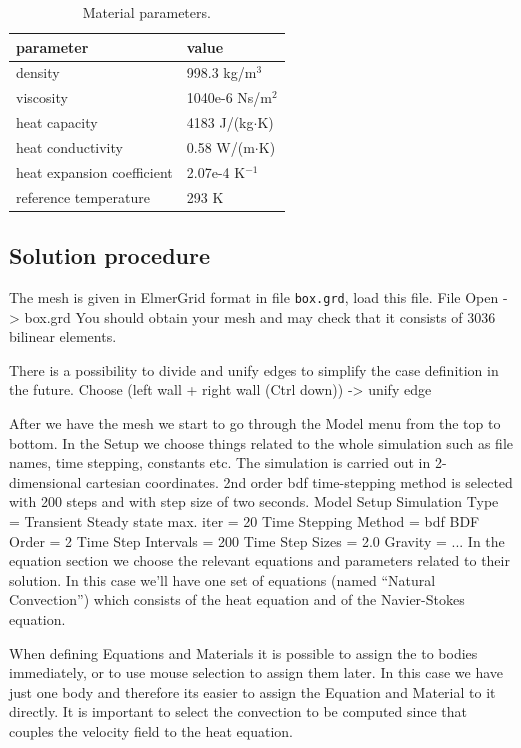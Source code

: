 \begin{table}[h]
\caption{Material parameters.}
\label{tb:matpar}
\begin{center}
\begin{tabular}{ll} \hline
parameter  & value \\ \hline
density & 998.3 kg/m$^{3}$ \\
viscosity & 1040e-6 Ns/m$^{2}$ \\
heat capacity & 4183 J/(kg$\cdot$K) \\
heat conductivity & 0.58 W/(m$\cdot$K)       \\
heat expansion coefficient & 2.07e-4 K$^{-1}$      \\ 
reference temperature & 293 K       \\ \hline
\end{tabular}
\end{center}
\end{table}


\subsection*{Solution procedure}

The mesh is given in ElmerGrid format in file \texttt{box.grd}, load this file.
\ttbegin
File 
  Open -> box.grd
\ttend
You should obtain your mesh and may check that it consists of 3036 bilinear elements.

There is a possibility to divide and unify edges to simplify the case definition in the future.
\ttbegin
Choose (left wall + right wall (Ctrl down)) -> unify edge
\ttend

After we have the mesh we start to go through the Model menu from the top to bottom. 
In the Setup we choose things related to the whole simulation such as file names, 
time stepping, constants etc.
The simulation is carried out in 2-dimensional cartesian
coordinates. 2nd order bdf time-stepping method is selected with 200 steps
and with step size of two seconds.
\ttbegin
Model
  Setup 
    Simulation Type = Transient
    Steady state max. iter = 20
    Time Stepping Method = bdf
    BDF Order = 2
    Time Step Intervals = 200
    Time Step Sizes = 2.0
    Gravity = ...
\ttend
In the equation section we choose the relevant equations and parameters related to their solution. 
In this case we'll have one set of equations (named ``Natural Convection'') which consists of the heat equation
and of the Navier-Stokes equation.

When defining Equations and Materials it is possible to assign the to bodies immediately, or to use mouse
selection to assign them later. In this case we have just one body and therefore its easier to assign 
the Equation and Material to it directly.
It is important to select the 
convection to be computed since that couples the velocity field to the heat equation.

